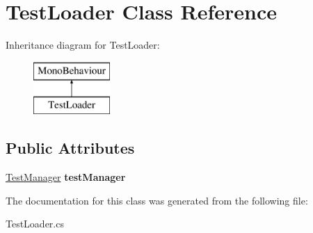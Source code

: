\hypertarget{class_test_loader}{}\section{Test\+Loader Class Reference}
\label{class_test_loader}
Inheritance diagram for Test\+Loader\+:\begin{figure}[H]
\begin{center}
\leavevmode
\includegraphics[height=2.000000cm]{class_test_loader}
\end{center}
\end{figure}
\subsection*{Public Attributes}
\begin{DoxyCompactItemize}
\item 
\mbox{\label{class_test_loader_a87ab33aa8b5c48dde4f237e280d2fe61}} 
\mbox{\hyperlink{class_test_manager}{Test\+Manager}} {\bfseries test\+Manager}
\end{DoxyCompactItemize}


The documentation for this class was generated from the following file\+:\begin{DoxyCompactItemize}
\item 
Test\+Loader.\+cs\end{DoxyCompactItemize}
